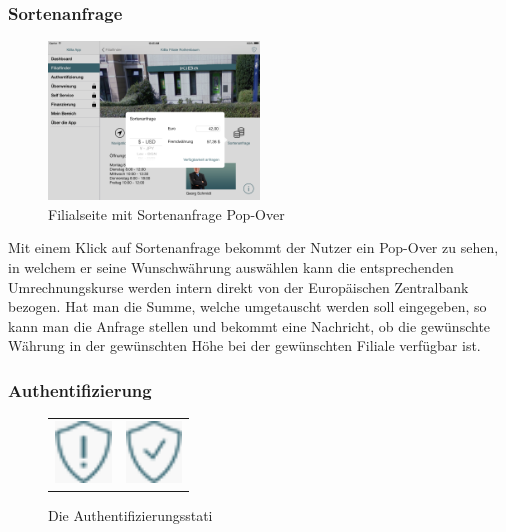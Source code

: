 \subsubsection{Sortenanfrage}

\begin{figure}[h]
	\centering
  \includegraphics[width=0.5\textwidth]{Pictures/Sortenanfrage}
	\caption{Filialseite mit Sortenanfrage Pop-Over}
	\label{fig3}
\end{figure}

	Mit einem Klick auf Sortenanfrage bekommt der Nutzer ein Pop-Over zu sehen, in welchem er seine Wunschwährung auswählen kann die entsprechenden Umrechnungskurse werden intern direkt von der Europäischen Zentralbank bezogen. Hat man die Summe, welche umgetauscht werden soll eingegeben, so kann man die Anfrage stellen und bekommt eine Nachricht, ob die gewünschte Währung in der gewünschten Höhe bei der gewünschten Filiale verfügbar ist.

\subsubsection{Authentifizierung}
\begin{figure}[h]
    \centering
	\begin{tabular}{@{}cc@{}}
        	\includegraphics[width=1.5cm]{Pictures/notauth} &
    		\includegraphics[width=1.5cm]{Pictures/authed}
    \end{tabular}
	\caption{Die Authentifizierungsstati\label{fig4}}
\end{figure}

